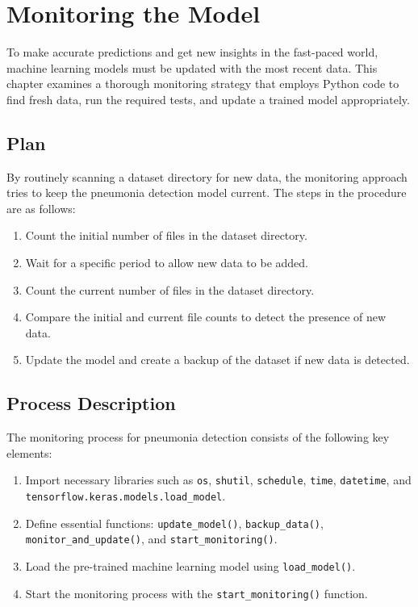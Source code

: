 %
%
%
	
\chapter{Monitoring the Model}
	
To make accurate predictions and get new insights in the fast-paced world, machine learning models must be updated with the most recent data. This chapter examines a thorough monitoring strategy that employs Python code to find fresh data, run the required tests, and update a trained model appropriately. 
	
\section{Plan}

By routinely scanning a dataset directory for new data, the monitoring approach tries to keep the pneumonia detection model current. The steps in the procedure are as follows:

\begin{enumerate}
	\item Count the initial number of files in the dataset directory.
	\item Wait for a specific period to allow new data to be added.
	\item Count the current number of files in the dataset directory.
	\item Compare the initial and current file counts to detect the presence of new data.
	\item Update the model and create a backup of the dataset if new data is detected.
\end{enumerate}

	
\section{Process Description}

The monitoring process for pneumonia detection consists of the following key elements:

\begin{enumerate}
	\item Import necessary libraries such as \texttt{os}, \texttt{shutil}, \texttt{schedule}, \texttt{time}, \texttt{datetime}, and \texttt{tensorflow.keras.models.load\_model}.
	\item Define essential functions: \texttt{update\_model()}, \texttt{backup\_data()}, \texttt{monitor\_and\_update()}, and \texttt{start\_monitoring()}.
	\item Load the pre-trained machine learning model using \texttt{load\_model()}.
	\item Start the monitoring process with the \texttt{start\_monitoring()} function.
\end{enumerate}

